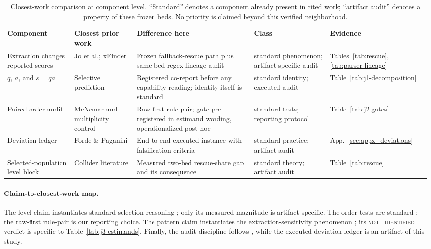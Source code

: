 \documentclass{article}
\begin{document}
\begin{table}[!t]
\centering\footnotesize
\setlength{\tabcolsep}{3pt}
\begin{tabular}{@{}>{\raggedright\arraybackslash}p{2.6cm}
                    >{\raggedright\arraybackslash}p{2.6cm}
                    >{\raggedright\arraybackslash}p{3.5cm}
                    >{\raggedright\arraybackslash}p{2.1cm}
                    >{\raggedright\arraybackslash}p{2.2cm}@{}}
\toprule
Component & Closest prior work & Difference here & Class & Evidence \\
\midrule
Extraction changes reported scores & Jo et al.; xFinder \citep{jo2025finding,yu2024xfinder} & Frozen fallback-rescue path plus same-bed regex-lineage audit & standard phenomenon; artifact-specific audit & Tables~\ref{tab:rescue}, \ref{tab:parser-lineage} \\
$q$, $a$, and $s{=}qa$ & Selective prediction \citep{elyaniv2010selective} & Registered co-report before any capability reading; identity itself is standard & standard identity; executed audit & Table~\ref{tab:j1-decomposition} \\
Paired order audit & McNemar and multiplicity control \citep{mcnemar1947note,dunn1961multiple} & Raw-first rule-pair; gate pre-registered in estimand wording, operationalized post hoc & standard tests; reporting protocol & Table~\ref{tab:j2-gates} \\
Deviation ledger & Forde \& Paganini \citep{forde2019scientific} & End-to-end executed instance with falsification criteria & standard practice; artifact audit & App.~\ref{sec:appx_deviations} \\
Selected-population level block & Collider literature \citep{elwert2014endogenous} & Measured two-bed rescue-share gap and its consequence & standard theory; artifact audit & Table~\ref{tab:rescue} \\
\bottomrule
\end{tabular}
\caption{Closest-work comparison at component level.  ``Standard'' denotes a
component already present in cited work; ``artifact audit'' denotes a property
of these frozen beds.  No priority is claimed beyond this verified neighborhood.}
\label{tab:closest-work}
\end{table}

\paragraph{Claim-to-closest-work map.}
The level claim instantiates standard selection reasoning
\citep{elwert2014endogenous}; only its measured magnitude is artifact-specific.
The order tests are standard \citep{mcnemar1947note,dunn1961multiple}; the
raw-first rule-pair is our reporting choice.  The pattern claim instantiates
the extraction-sensitivity phenomenon \citep{jo2025finding,yu2024xfinder}; its
\textsc{not\_identified} verdict is specific to
Table~\ref{tab:j3-estimands}.  Finally,
the audit discipline follows \citet{forde2019scientific}, while the executed
deviation ledger is an artifact of this study.
\end{document}
